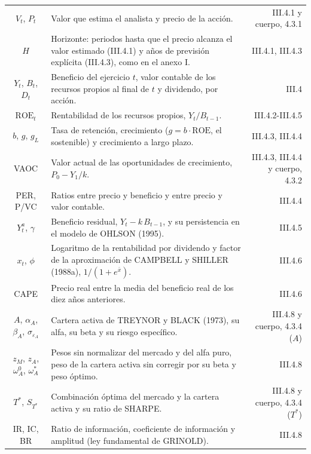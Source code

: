 \documentclass[10pt,a4paper]{article}
\begin{document}
\begin{longtable}{SMD}
$V_t$, $P_t$ & Valor que estima el analista y precio de la acción. & III.4.1 y cuerpo, 4.3.1\\
$H$ & Horizonte: periodos hasta que el precio alcanza el valor estimado (III.4.1) y años de previsión explícita (III.4.3), como en el anexo I. & III.4.1, III.4.3\\
$Y_t$, $B_t$, $D_t$ & Beneficio del ejercicio $t$, valor contable de los recursos propios al final de $t$ y dividendo, por acción. & III.4\\
$\text{ROE}_t$ & Rentabilidad de los recursos propios, $Y_t/B_{t-1}$. & III.4.2-III.4.5\\
$b$, $g$, $g_L$ & Tasa de retención, crecimiento ($g=b\cdot\text{ROE}$, el sostenible) y crecimiento a largo plazo. & III.4.3, III.4.4\\
VAOC & Valor actual de las oportunidades de crecimiento, $P_0-Y_1/k$. & III.4.3, III.4.4 y cuerpo, 4.3.2\\
PER, P/VC & Ratios entre precio y beneficio y entre precio y valor contable. & III.4.4\\
$Y^a_t$, $\gamma$ & Beneficio residual, $Y_t-k\,B_{t-1}$, y su persistencia en el modelo de OHLSON (1995). & III.4.5\\
$x_t$, $\phi$ & Logaritmo de la rentabilidad por dividendo y factor de la aproximación de CAMPBELL y SHILLER (1988a), $1/(1+e^{\bar x})$. & III.4.6\\
CAPE & Precio real entre la media del beneficio real de los diez años anteriores. & III.4.6\\
$A$, $\alpha_A$, $\beta_A$, $\sigma_{\varepsilon_A}$ & Cartera activa de TREYNOR y BLACK (1973), su alfa, su beta y su riesgo específico. & III.4.8 y cuerpo, 4.3.4 ($A$)\\
$z_M$, $z_A$, $\omega_A^0$, $\omega_A^*$ & Pesos sin normalizar del mercado y del alfa puro, peso de la cartera activa sin corregir por su beta y peso óptimo. & III.4.8\\
$T^*$, $S_{T^*}$ & Combinación óptima del mercado y la cartera activa y su ratio de SHARPE. & III.4.8 y cuerpo, 4.3.4 ($T^*$)\\
IR, IC, BR & Ratio de información, coeficiente de información y amplitud (ley fundamental de GRINOLD). & III.4.8\\
\end{longtable}
\end{document}
